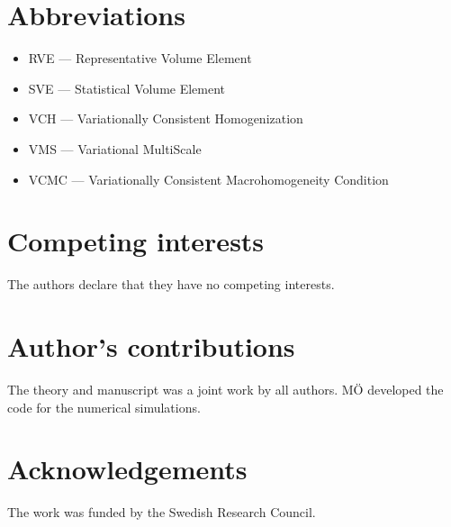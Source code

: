 \documentclass{bmcart}
\begin{document}
\begin{backmatter}

\section*{Abbreviations}
  \begin{itemize}
   \item RVE --- Representative Volume Element
   \item SVE --- Statistical Volume Element
   \item VCH --- Variationally Consistent Homogenization
   \item VMS --- Variational MultiScale
   \item VCMC --- Variationally Consistent Macrohomogeneity Condition
  \end{itemize}


\section*{Competing interests}
  The authors declare that they have no competing interests.

\section*{Author's contributions}
  The theory and manuscript was a joint work by all authors. MÖ developed the code for the numerical simulations.

\section*{Acknowledgements}
  The work was funded by the Swedish Research Council.



\end{backmatter}
\end{document}

